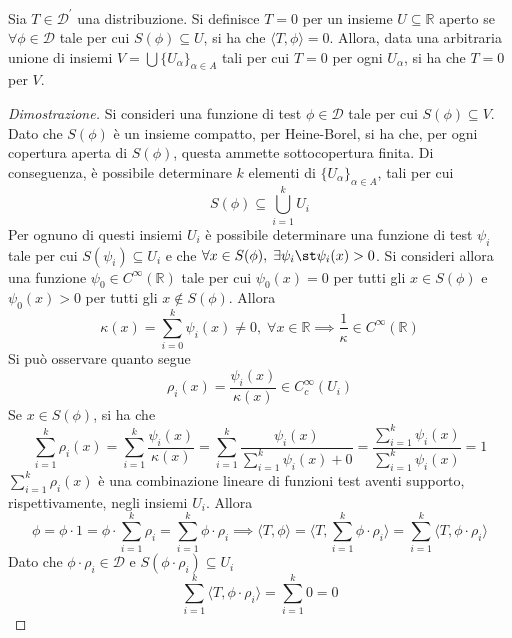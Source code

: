         \begin{proposition}
            Sia $T \in \mathcal{D}^{'}$ una distribuzione.
            Si definisce $T = 0$ per un insieme $U \subseteq \mathbb{R}$ aperto se $\forall \phi \in \mathcal{D}$ tale per cui $S(\phi) \subseteq U$, si ha che $\langle T, \phi \rangle = 0$.
            Allora, data una arbitraria unione di insiemi $V = \bigcup \{U_{\alpha}\}_{\alpha \in A}$ tali per cui $T = 0$ per ogni $U_{\alpha}$, si ha che $T = 0$ per $V$.
        \end{proposition}

        \begin{proof}[Dimostrazione]
            Si consideri una funzione di test $\phi \in \mathcal{D}$ tale per cui $S(\phi) \subseteq V$.
            Dato che $S(\phi)$ è un insieme compatto, per Heine-Borel, si ha che, per ogni copertura aperta di $S(\phi)$, questa ammette sottocopertura finita.
            Di conseguenza, è possibile determinare $k$ elementi di $\{U_{\alpha}\}_{\alpha \in A}$, tali per cui
            \[
                S(\phi) \subseteq \bigcup_{i = 1}^{k} U_{i}
            \]
            Per ognuno di questi insiemi $U_{i}$ è possibile determinare una funzione di test $\psi_{i}$ tale per cui $S(\psi_{i}) \subseteq U_{i}$ e che $\forall x \in S(\phi), \; \exists \psi_{i} \st \psi_{i}(x) > 0$.
            Si consideri allora una funzione $\psi_{0} \in C^{\infty}(\mathbb{R})$ tale per cui $\psi_{0}(x) = 0$ per tutti gli $x \in S(\phi)$ e $\psi_{0}(x) > 0$ per tutti gli $x \notin S(\phi)$.
            Allora
            \[
                \kappa(x) = \sum_{i = 0}^{k} \psi_{i}(x) \neq 0, \; \forall x \in \mathbb{R} \implies \frac{1}{\kappa} \in C^{\infty}(\mathbb{R})
            \]
            Si può osservare quanto segue
            \[
                \rho_{i}(x) = \frac{\psi_{i}(x)}{\kappa(x)} \in C^{\infty}_{c}(U_{i})
            \]
            Se $x \in S(\phi)$, si ha che
            \[
                \sum_{i = 1}^{k} \rho_{i} (x) = \sum_{i = 1}^{k} \frac{\psi_{i}(x)}{\kappa(x)} = \sum_{i = 1}^{k} \frac{\psi_{i}(x)}{\sum_{i = 1}^{k} \psi_{i}(x) + 0} = \frac{\sum_{i = 1}^{k} \psi_{i}(x)}{\sum_{i = 1}^{k} \psi_{i}(x)} = 1
            \]
            $\sum_{i = 1}^{k} \rho_{i}(x)$ è una combinazione lineare di funzioni test aventi supporto, rispettivamente, negli insiemi $U_{i}$.
            Allora
            \[
                \phi = \phi \cdot 1 = \phi \cdot \sum_{i = 1}^{k} \rho_{i} = \sum_{i = 1}^{k} \phi \cdot \rho_{i} \implies \langle T, \phi \rangle = \langle T, \sum_{i = 1}^{k} \phi \cdot \rho_{i} \rangle = \sum_{i = 1}^{k} \langle T, \phi \cdot \rho_{i} \rangle
            \]
            Dato che $\phi \cdot \rho_{i} \in \mathcal{D}$ e $S(\phi \cdot \rho_{i}) \subseteq U_{i}$
            \[
                \sum_{i = 1}^{k} \langle T, \phi \cdot \rho_{i} \rangle = \sum_{i = 1}^{k} 0 = 0
            \]
        \end{proof}

